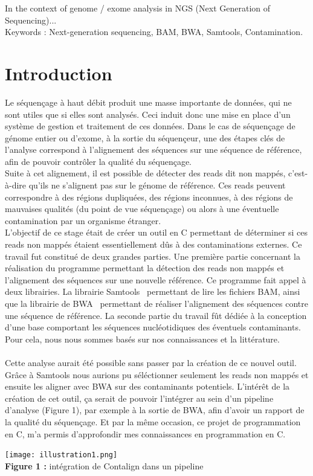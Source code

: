 \documentclass[a4paper,12pt]{article}
\begin{document}
In the context of genome / exome analysis in NGS (Next Generation of Sequencing)... \\

Keywords : Next-generation sequencing, BAM, BWA, Samtools, Contamination.
\clearpage %
\renewcommand{\contentsname}{Sommaire} 
\tableofcontents{} %
\clearpage

\section{Introduction}

Le séquençage à haut débit produit une masse importante de données, qui ne sont utiles que si elles sont analysés. Ceci induit donc une mise en place d'un système de gestion et traitement de ces données. Dans le cas de séquençage de génome entier ou d'exome, à la sortie du séquençeur, une des étapes clés de l'analyse correspond à l'alignement des séquences sur une séquence de référence, afin de pouvoir contrôler la qualité du séquençage. \\
Suite à cet alignement, il est possible de détecter des reads dit non mappés, c'est-à-dire qu'ils ne s'alignent pas sur le génome de référence. Ces reads peuvent correspondre à des régions dupliquées, des régions inconnues, à des régions de mauvaises qualités (du point de vue séquençage) ou alors à une éventuelle contamination par un organisme étranger. \\

L'objectif de ce stage était de créer un outil en C permettant de déterminer si ces reads non mappés étaient essentiellement dûs à des contaminations externes. Ce travail fut constitué de deux grandes parties. Une première partie concernant la réalisation du programme permettant la détection des reads non mappés et l'alignement des séquences sur une nouvelle référence. Ce programme fait appel à deux librairies. La librairie Samtools~\cite{SAM} permettant de lire les fichiers BAM, ainsi que la librairie de BWA~\cite{BWA} permettant de réaliser l'alignement des séquences contre une séquence de référence. La seconde partie du travail fût dédiée à la conception d'une base comportant les séquences nucléotidiques des éventuels contaminants. Pour cela, nous nous sommes basés sur nos connaissances et la littérature. \\\\
Cette analyse aurait été possible sans passer par la création de ce nouvel outil. Grâce à Samtools nous aurions pu séléctionner seulement les reads non mappés et ensuite les aligner avec BWA sur des contaminants potentiels. L'intérêt de la création de cet outil, ça serait de pouvoir l'intégrer au sein d'un pipeline d'analyse (Figure 1), par exemple à la sortie de BWA, afin d'avoir un rapport de la qualité du séquençage. Et par la même occasion, ce projet de programmation en C, m'a permis d'approfondir mes connaissances en programmation en C. 
\begin{center}
\texttt{[image: illustration1.png]}~\\
\textbf{Figure 1 :} intégration de Contalign dans un pipeline
\end{center}
\end{document}
